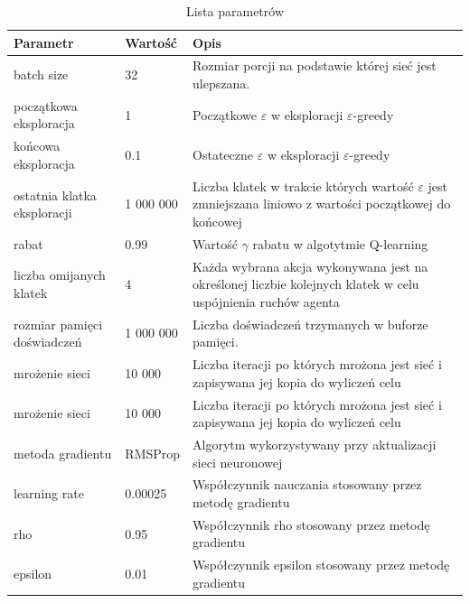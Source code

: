 \documentclass[12pt]{article}
\begin{document}
\begin{center}

\begin{table}[H]
  \centering%
  \caption{Lista parametrów}
\begin{tabular}{|p{3cm}|p{3cm}|p{10cm}|}
\hline
\textbf{Parametr} & \textbf{Wartość} & \textbf{Opis} \\
\hline

batch size &
32 & 
Rozmiar porcji na podstawie której sieć jest ulepszana. \\
\hline

początkowa eksploracja &
1 &
Początkowe $\varepsilon$ w eksploracji $\varepsilon$-greedy \\
\hline

końcowa eksploracja &
0.1 &
Ostateczne $\varepsilon$ w eksploracji $\varepsilon$-greedy \\
\hline

ostatnia klatka eksploracji &
1 000 000 &
Liczba klatek w trakcie których wartość $\varepsilon$ jest zmniejszana liniowo z wartości początkowej do końcowej\\
\hline

rabat &
0.99 &
Wartość $\gamma$ rabatu w algotytmie Q-learning\\
\hline

liczba omijanych klatek &
4 &
Każda wybrana akcja wykonywana jest na określonej liczbie kolejnych klatek w celu uspójnienia ruchów agenta \\
\hline

rozmiar pamięci doświadczeń &
1 000 000 &
Liczba doświadczeń trzymanych w buforze pamięci.
\\
\hline

mrożenie sieci &
10 000 &
Liczba iteracji po których mrożona jest sieć i zapisywana jej kopia do wyliczeń celu  \\
\hline

mrożenie sieci &
10 000 &
Liczba iteracji po których mrożona jest sieć i zapisywana jej kopia do wyliczeń celu  \\
\hline


metoda gradientu &
RMSProp &
Algorytm wykorzystywany przy aktualizacji sieci neuronowej  \\
\hline

learning rate &
0.00025 &
Współczynnik nauczania stosowany przez metodę gradientu  \\
\hline

rho &
0.95 &
Współczynnik rho stosowany przez metodę gradientu  \\
\hline

epsilon &
0.01&
Współczynnik epsilon stosowany przez metodę gradientu  \\
\hline

\end{tabular}
\end{table}
\end{center}
\end{document}
